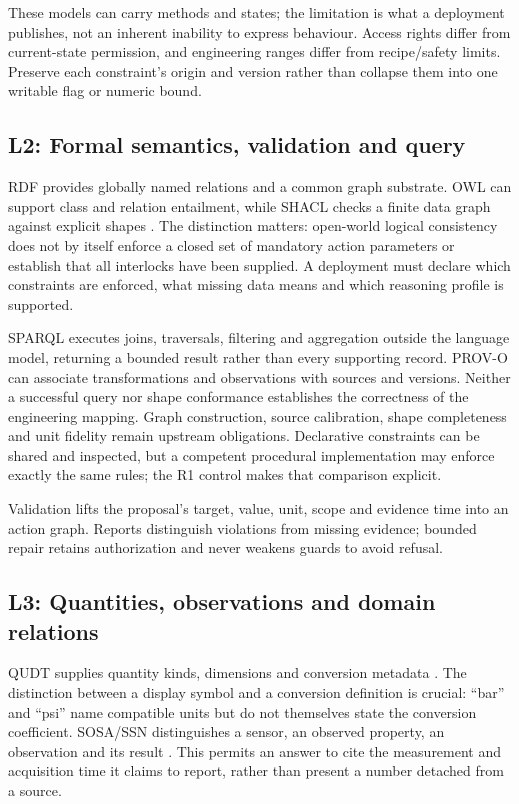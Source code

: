 These models can carry methods and states; the limitation is what a deployment
publishes, not an inherent inability to express behaviour. Access rights differ
from current-state permission, and engineering ranges differ from recipe/safety
limits. Preserve each constraint's origin and version rather than collapse them
into one writable flag or numeric bound.

\subsection{L2: Formal semantics, validation and query}
RDF provides globally named relations and a common graph substrate. OWL can
support class and relation entailment, while SHACL checks a finite data graph
against explicit shapes \cite{knublauch2017shacl}. The distinction matters:
open-world logical consistency does not by itself enforce a closed set of
mandatory action parameters or establish that all interlocks have been supplied.
A deployment must declare which constraints are enforced, what missing data
means and which reasoning profile is supported.

SPARQL executes joins, traversals, filtering and aggregation outside the language
model, returning a bounded result rather than every supporting record. PROV-O
can associate transformations and observations with sources and versions. Neither
a successful query nor shape conformance establishes the correctness of the
engineering mapping. Graph construction, source calibration, shape completeness
and unit fidelity remain upstream obligations. Declarative constraints can be
shared and inspected, but a competent procedural implementation may enforce
exactly the same rules; the R1 control makes that comparison explicit.

Validation lifts the proposal's target, value, unit, scope and evidence time into
an action graph. Reports distinguish violations from missing evidence; bounded
repair retains authorization and never weakens guards to avoid refusal.

\subsection{L3: Quantities, observations and domain relations}
QUDT supplies quantity kinds, dimensions and conversion metadata \cite{qudt}.
The distinction between a display symbol and a conversion definition is crucial:
``bar'' and ``psi'' name compatible units but do not themselves state the
conversion coefficient. SOSA/SSN distinguishes a sensor, an observed property,
an observation and its result \cite{haller2019ssn}. This permits an answer to
cite the measurement and acquisition time it claims to report, rather than
present a number detached from a source.

